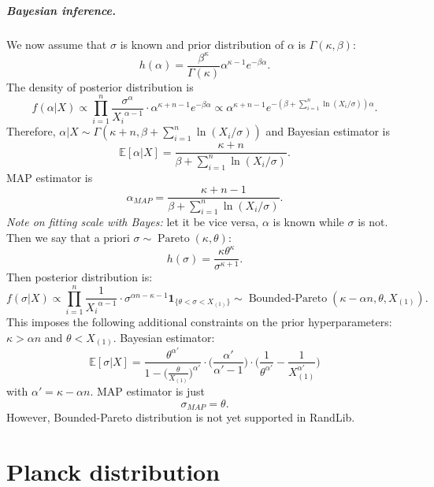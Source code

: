 \documentclass[a4paper,11pt]{article}
\theoremstyle{plain}
\theoremstyle{definition}
\begin{document}
\subparagraph{Bayesian inference.} We now assume that $\sigma$ is known and prior distribution of $\alpha$ is $\Gamma(\kappa, \beta)$:
\[
h(\alpha) = \frac{\beta^\kappa}{\Gamma(\kappa)} \alpha^{\kappa-1}e^{-\beta \alpha}.
\]
The density of posterior distribution is
\[
f(\alpha | X) \propto \prod_{i=1}^n \frac{\sigma^\alpha}{{X_i}^{\alpha-1}} \cdot \alpha^{\kappa+n-1}e^{-\beta \alpha} \propto \alpha^{\kappa+n-1} e^{ -(\beta + \sum_{i=1}^n \ln (X_i/\sigma))\alpha }.
\]
Therefore, $\alpha |X \sim \Gamma(\kappa + n, \beta +\sum_{i=1}^n \ln (X_i/\sigma))$ and Bayesian estimator is
\[ \mathbb{E}[\alpha | X] = \frac{\kappa + n}{ \beta +\sum_{i=1}^n \ln (X_i/\sigma) }. \]
MAP estimator is
\[ \alpha_{MAP} = \frac{\kappa + n-1}{ \beta +\sum_{i=1}^n \ln (X_i/\sigma) }. \]
\textit{Note on fitting scale with Bayes:} let it be vice versa, $\alpha$ is known while $\sigma$ is not. Then we say that a priori $\sigma \sim \operatorname{Pareto}(\kappa, \theta)$:
\[
h(\sigma) = \frac{\kappa\theta^\kappa}{\sigma^{\kappa+1}}.
\]
Then posterior distribution is:
\[
f(\sigma|X) \propto \prod_{i=1}^n \frac{1}{{X_i}^{\alpha-1}} \cdot \sigma^{\alpha n - \kappa - 1} \mathbf{1}_{ \{ \theta < \sigma < X_{(1)}\} } \sim \operatorname{Bounded-Pareto}(\kappa-\alpha n, \theta, X_{(1)}).
\]
This imposes the following additional constraints on the prior hyperparameters: $\kappa > \alpha n$ and $\theta < X_{(1)}$. Bayesian estimator:
\[
\mathbb{E}[\sigma|X] = \frac{\theta^{\alpha'}}{1-\Big(\frac{\theta}{X_{(1)}}\Big)^{\alpha'}} \cdot \Big(\frac{\alpha'}{\alpha'-1}\Big)\cdot \bigg( \frac{1}{\theta^{\alpha'}} -\frac{1}{X_{(1)}^{\alpha'}} \bigg)
\]
with $\alpha'=\kappa - \alpha n$.
MAP estimator is just
\[
\sigma_{MAP} = \theta.
\]
However, Bounded-Pareto distribution is not yet supported in RandLib.

	
	\pagebreak
	\section{Planck distribution}
	
\end{document}
